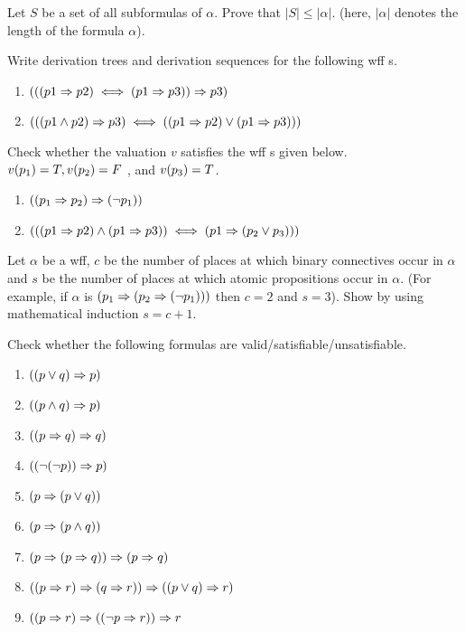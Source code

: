 \begin{exercise}
Let $S$ be a set of all subformulas of $\alpha$. Prove that $| S | ≤ | \alpha |$. (here, $| \alpha |$ denotes the length of the formula $\alpha$).
\end{exercise}

\begin{exercise}
Write derivation trees and derivation sequences for the following wff s. 
\begin{enumerate}
\item $(((p1 \Rightarrow p2)\iff(p1 \Rightarrow p3))\Rightarrow p3)$
\item $(((p1 \wedge p2)\Rightarrow p3)\iff ((p1 \Rightarrow p2)\vee (p1 \Rightarrow p3)))$
\end{enumerate}
\end{exercise}

\begin{exercise}
Check whether the valuation $v$ satisfies the wff s given below. $v(p_1) = T , v(p_2) = F$ , and $v(p_3) = T$.
\begin{enumerate}
\item $((p_1 \Rightarrow p_2) \Rightarrow (\neg p_1))$
\item $(((p1 \Rightarrow p2) \wedge (p1 \Rightarrow p3))\iff(p1 \Rightarrow (p_2 \vee p_3)))$
\end{enumerate}
\end{exercise}


\begin{exercise}
Let $\alpha$ be a wff, $c$ be the number of places at which binary connectives occur in $\alpha$ and $s$ be the number of places at which atomic propositions occur in $\alpha$. (For example, if $\alpha$ is $(p_1 \Rightarrow (p_2 \Rightarrow (\neg p_1)))$ then $c=2$ and $s=3$). Show by using mathematical induction $s=c+1$.
\end{exercise}

\begin{exercise}
Check whether the following formulas are valid/satisfiable/unsatisfiable.
\begin{multicols}{2}
\begin{enumerate}
\item $((p \vee q) \Rightarrow p)$
\item $((p \wedge q)\Rightarrow p)$
\item $((p \Rightarrow q) \Rightarrow q)$ 
\item $((\neg(\neg p))\Rightarrow p)$
\item $(p \Rightarrow (p \vee q))$
\item $(p \Rightarrow (p \wedge q))$
\item $(p \Rightarrow (p \Rightarrow q))\Rightarrow (p\Rightarrow q)$
\item $((p\Rightarrow r)\Rightarrow (q\Rightarrow r))\Rightarrow ((p\vee q)\Rightarrow r)$ 
\item $((p\Rightarrow r)\Rightarrow ((\neg p\Rightarrow r))\Rightarrow r$
\end{enumerate}
\end{multicols}
\end{exercise}

